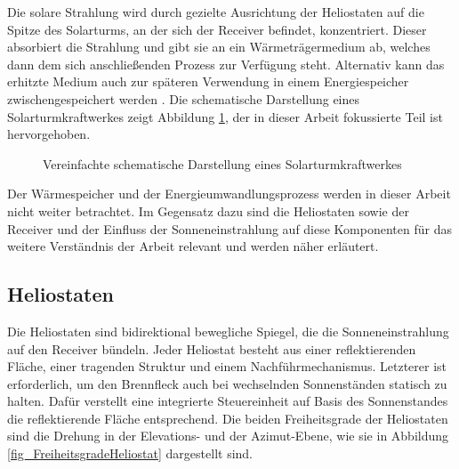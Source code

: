 Die solare Strahlung wird durch gezielte Ausrichtung der Heliostaten auf die Spitze des Solarturms, an der sich der Receiver befindet, konzentriert.
Dieser absorbiert die Strahlung und gibt sie an ein Wärmeträgermedium ab, welches dann dem sich anschließenden Prozess zur Verfügung steht.
Alternativ kann das erhitzte Medium auch zur späteren Verwendung in einem Energiespeicher zwischengespeichert werden \cite[S.11]{DissBelhomme}.
Die schematische Darstellung eines Solarturmkraftwerkes zeigt Abbildung \ref{fig_SchemaSolarturmkraftwerk}, der in dieser Arbeit fokussierte Teil ist hervorgehoben.

\begin{figure}[h!]
    \centering
\setlength{\fboxsep}{5pt}
    \setlength{\fboxrule}{1pt}
\caption[Vereinfachte schematische Darstellung eines Solarturmkraftwerkes]{Vereinfachte schematische Darstellung eines Solarturmkraftwerkes \cite[S.5]{DissZanger}}
    \label{fig_SchemaSolarturmkraftwerk}
\end{figure}


Der Wärmespeicher und der Energieumwandlungsprozess werden in dieser Arbeit nicht weiter betrachtet.
Im Gegensatz dazu sind die Heliostaten sowie der Receiver und der Einfluss der Sonneneinstrahlung auf diese Komponenten für das weitere Verständnis der Arbeit relevant und werden näher erläutert.


\subsection{Heliostaten} \label{subsec_Heliostaten}
Die Heliostaten sind bidirektional bewegliche Spiegel, die die Sonneneinstrahlung auf den Receiver bündeln.
Jeder Heliostat besteht aus einer reflektierenden Fläche, einer tragenden Struktur und einem Nachführmechanismus.
Letzterer ist erforderlich, um den Brennfleck auch bei wechselnden Sonnenständen statisch zu halten.
Dafür verstellt eine integrierte Steuereinheit auf Basis des Sonnenstandes die reflektierende Fläche entsprechend.
Die beiden Freiheitsgrade der Heliostaten sind die Drehung in der Elevations- und der Azimut-Ebene, wie sie in Abbildung \ref{fig_FreiheitsgradeHeliostat} dargestellt sind. \cite[S.13]{DissBelhomme}

